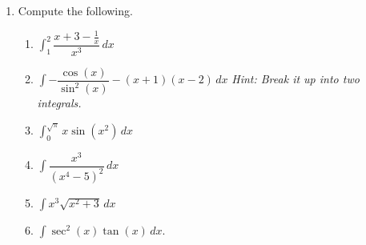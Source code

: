 \documentclass[12pt]{article}
\begin{document}
\begin{enumerate}
    \item Compute the following. 
    \begin{enumerate}
        \item $\displaystyle\int_1^2 \dfrac{x+3-\frac{1}{x}}{x^3} \, dx$
        \vfill

        \item $\displaystyle\int -\dfrac{\cos(x)}{\sin^2(x)} - (x+1)(x-2)\, dx$ \emph{Hint: Break it up into two integrals.}
        \vfill
    \pagebreak
    
    \item $\displaystyle\int_0^{\sqrt{\pi}} x\sin(x^2)\, dx$
    \vfill
    
    \item $\displaystyle\int \dfrac{x^3}{(x^4-5)^2}\, dx$
    \vfill
    \pagebreak
    
    \item $\displaystyle\int x^3\sqrt{x^2+3}\, dx$
    \vfill
    \item $\displaystyle\int \sec^2(x)\tan(x)\, dx$.
    \vfill
    \pagebreak
    \end{enumerate}
    \end{enumerate}
\end{document}
